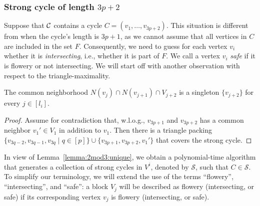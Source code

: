 \subsubsection{Strong cycle of length $3p + 2$} \label{sssec:2mod3}

Suppose that $\mathcal C$ contains a cycle $C = (v_{1}, \dots, v_{3p+2})$.
This situation is different from when the cycle's length is $3p + 1$, as we cannot  assume that all vertices in $C$ are included in the set $F$. Consequently, we need to guess for each vertex $v_i$ whether it is \emph{intersecting}, i.e., whether it is part of $F$. 
We call a vertex $v_i$ \emph{safe} if it is flowery or not intersecting.
We will start off with another observation with respect to the triangle-maximality.

\begin{lemma} \label{lemma:2mod3:unique}
  The common neighborhood $N(v_{j}) \cap N(v_{j+1}) \cap V_{j+2}$ is a singleton $\{ v_{j+2} \}$ for every $j \in [l_i]$.
\end{lemma}
\begin{proof}
  Assume for contradiction that, w.l.o.g., $v_{3p+1}$ and $v_{3p+2}$ has a common neighbor $v_{1}' \in V_{1}$ in addition to $v_{1}$.
  Then there is a triangle packing $\{ v_{3q-2}, v_{3q-1}, v_{3q} \mid q \in [p]\} \cup \{ v_{3p+1}, v_{3p+2}, v_{1}' \}$ that covers the strong cycle.
\end{proof}

In view of Lemma~\ref{lemma:2mod3:unique}, we obtain a polynomial-time algorithm that generates a collection of strong cycles in $V^i$, denoted by $\mathcal{S}$, such that $C \in \mathcal{S}$.
To simplify our terminology, we will extend the use of the terms ``flowery'', ``intersecting'', and ``safe'': a block $V_{j}$ will be described as flowery (intersecting, or safe) if its corresponding vertex $v_{j}$ is flowery (intersecting, or safe).

